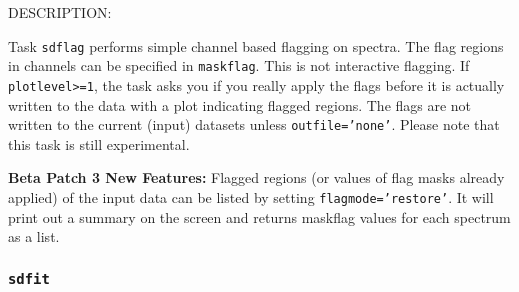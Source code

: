     DESCRIPTION:

    Task {\tt sdflag} performs simple channel based flagging on spectra.
    The flag regions in channels can be specified in {\tt maskflag}. This
    is not interactive flagging. If {\tt plotlevel>=1}, the task asks 
    you if you really apply the flags before it is actually written to the data 
    with a plot indicating flagged regions. The flags
    are not written to the current (input) datasets unless {\tt outfile='none'}.
    Please note that this task is still experimental.

    {\bf Beta Patch 3 New Features:}
    Flagged regions (or values of flag masks already applied) of the input data 
    can be listed by setting {\tt flagmode='restore'}. It will print out a summary on
    the screen and returns maskflag values for each spectrum as a list.

\subsubsection{{\tt sdfit}}
\label{section:sd.sdtasks.tasks.sdfit}

